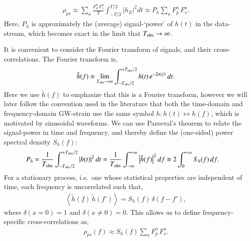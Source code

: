 \documentclass[onecolumn,authoryear]{els-mrw}
\begin{document}
\begin{align}\label{eq:redshift-correlation-approx}
    \rho_{ps} \approx \sum_a \frac{F^a_p \, F^a_s}{T} \int_{-T/2}^{T/2} \big| h_{E} \big|^2 dt \approx P_h \sum_a F^a_p \, F^a_s.
\end{align}
Here, $P_h$ is approximately the (average) signal-`power' of $h(t)$ in the data-stream, which becomes exact in the limit that $T_{\textrm{obs}} \rightarrow \infty$.

It is convenient to consider the Fourier transform of signals, and their cross-correlations.  The Fourier transform is,
\begin{align}\label{eq:fourier-transform}
    \tilde{h}(f) \equiv \lim_{T_{\textrm{obs}}\rightarrow \infty} \int_{-T_{\textrm{obs}}/2}^{+T_{\textrm{obs}}/2} h(t) \, e^{-2 \pi i f t} \, d t.
\end{align}
Here we use $\tilde{h}(f)$ to emphasize that this is a Fourier transform, however we will later follow the convention used in the literature that both the time-domain and frequency-domain GW-strain use the same symbol $h: h(t) \leftrightarrow h(f)$, which is motivated by sinusoidal waveforms.  We can use Parseval's theorem to relate the signal-power in time and frequency, and thereby define the (one-sided) power spectral density $S_h(f)$:
\begin{align}\label{eq:psd_fourier}
    P_h & = \frac{1}{T_{\textrm{obs}}} \int_{-T_{\textrm{obs}}/2}^{+T_{\textrm{obs}}/2} \left| h(t) \right|^2 dt = \frac{1}{T_{\textrm{obs}}} \int_{-\infty}^{+\infty} \left| \tilde{h}(f) \right|^2 df \equiv 2 \int_{0}^{+\infty} S_h(f) \, df.
\end{align}
For a stationary process, i.e.~one whose statistical properties are independent of time, each frequency is uncorrelated such that,
\begin{align}
    \left< \tilde{h}(f) \, \tilde{h}(f') \right> = S_h(f) \, \delta(f - f'),
\end{align}
where $\delta(x\!=\!0) = 1$ and $\delta(x\!\neq\!0) = 0$.  This allows us to define frequency-specific cross-correlations as,
\begin{align}\label{eq:redshift-correlation-frequency}
    \rho_{ps}(f) \approx S_h(f) \sum_a F^a_p \, F^a_s.
\end{align}
\end{document}
